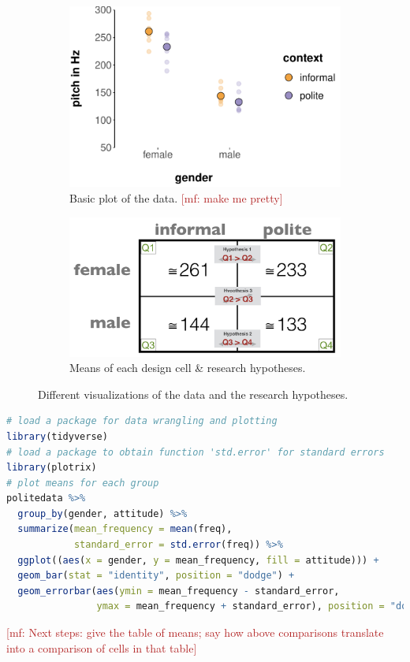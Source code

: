 \documentclass[fleqn,reqno,12pt]{article}
\renewcommand{\mf}[1]{\textcolor{firebrick}{[mf: #1]}}
\begin{document}
\begin{figure}[t]
  \centering
  \begin{subfigure}[c]{0.495\textwidth}
    \includegraphics[width = \textwidth]{pics/basic_data_plot.pdf}
    \caption{Basic plot of the data. \mf{make me pretty}}
     \label{fig:BasicPlotData_data}
  \end{subfigure}
  \begin{subfigure}[c]{0.495\textwidth}
    \includegraphics[width = \textwidth]{pics/table_mean_hypotheses.png}
    \caption{Means of each design cell \& research hypotheses.}
    \label{fig:BasicPlotData_table}
  \end{subfigure}
  \caption{Different visualizations of the data and the research hypotheses.}
  \label{fig:BasicPlotData}
\end{figure}


\medskip

\begin{lstlisting}[language=R]
# load a package for data wrangling and plotting
library(tidyverse)
# load a package to obtain function 'std.error' for standard errors
library(plotrix)
# plot means for each group
politedata %>% 
  group_by(gender, attitude) %>% 
  summarize(mean_frequency = mean(freq),
            standard_error = std.error(freq)) %>% 
  ggplot((aes(x = gender, y = mean_frequency, fill = attitude))) + 
  geom_bar(stat = "identity", position = "dodge") +
  geom_errorbar(aes(ymin = mean_frequency - standard_error,
                ymax = mean_frequency + standard_error), position = "dodge")
\end{lstlisting}


\mf{Next steps: give the table of means; say how above comparisons translate into a comparison of cells in that table}




\printbibliography[heading=bibintoc]
\end{document}
